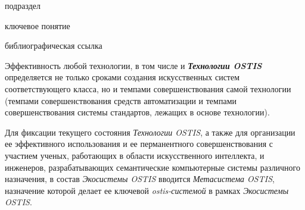 \begin{SCn}
\begin{scnrelfromlist}{подраздел}
\end{scnrelfromlist}

\bigskip

\begin{scnrelfromlist}{ключевое понятие}
\end{scnrelfromlist}

\bigskip

\begin{scnrelfromlist}{библиографическая ссылка}
\end{scnrelfromlist}
\end{SCn}

Эффективность любой технологии, в том числе и \textbf{\textit{Технологии OSTIS}} определяется не только сроками создания искусственных систем соответствующего класса, но и темпами совершенствования самой технологии (темпами совершенствования средств автоматизации и темпами совершенствования системы стандартов, лежащих в основе технологии).

Для фиксации текущего состояния \textit{Технологии OSTIS}, а также для организации ее эффективного использования и ее перманентного совершенствования с участием ученых, работающих в области искусственного интеллекта, и инженеров, разрабатывающих семантические компьютерные системы различного назначения, в состав \textit{Экосистемы OSTIS} вводится \textit{Метасистема OSTIS}, назначение которой делает ее ключевой \textit{ostis-системой} в рамках \textit{Экосистемы OSTIS}.

\newpage

\begin{SCn}
\end{SCn}	

